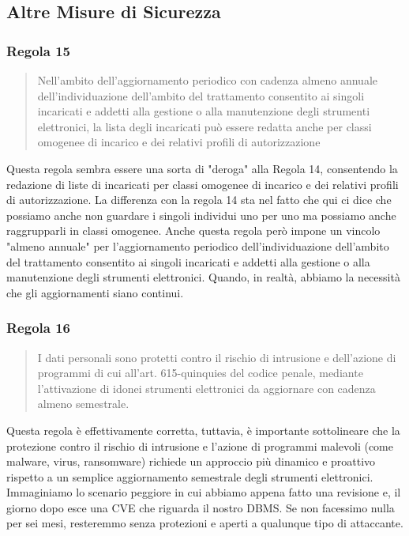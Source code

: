 \subsection{Altre Misure di Sicurezza}
\subsubsection*{Regola 15}
\begin{quote}
    Nell'ambito dell'aggiornamento periodico con cadenza almeno annuale dell'individuazione dell'ambito del trattamento consentito ai singoli incaricati e addetti alla gestione o alla manutenzione degli strumenti elettronici, la lista degli incaricati può essere redatta anche per classi omogenee di incarico e dei relativi profili di autorizzazione
\end{quote}

Questa regola sembra essere una sorta di "deroga" alla Regola 14, consentendo la redazione di liste di incaricati per classi omogenee di incarico e dei relativi profili di autorizzazione.
La differenza con la regola 14 sta nel fatto che qui ci dice che possiamo anche non guardare i singoli individui uno per uno ma possiamo anche raggrupparli in classi omogenee.
Anche questa regola però impone un vincolo "almeno annuale" per l'aggiornamento periodico dell'individuazione dell'ambito del trattamento consentito ai singoli incaricati e addetti alla gestione o alla manutenzione degli strumenti elettronici.
Quando, in realtà, abbiamo la necessità che gli aggiornamenti siano continui.
\subsubsection*{Regola 16}
\begin{quote}
    I dati personali sono protetti contro il rischio di intrusione e dell'azione di programmi di cui all'art. 615-quinquies del codice penale, mediante l'attivazione di idonei strumenti elettronici da aggiornare con cadenza almeno semestrale.
\end{quote}

Questa regola è effettivamente corretta, tuttavia, è importante sottolineare che la protezione contro il rischio di intrusione e l'azione di programmi malevoli (come malware, virus, ransomware) richiede un approccio più dinamico e proattivo rispetto a un semplice aggiornamento semestrale degli strumenti elettronici.
Immaginiamo lo scenario peggiore in cui abbiamo appena fatto una revisione e, il giorno dopo esce una CVE che riguarda il nostro DBMS.
Se non facessimo nulla per sei mesi, resteremmo senza protezioni e aperti a qualunque tipo di attaccante.
